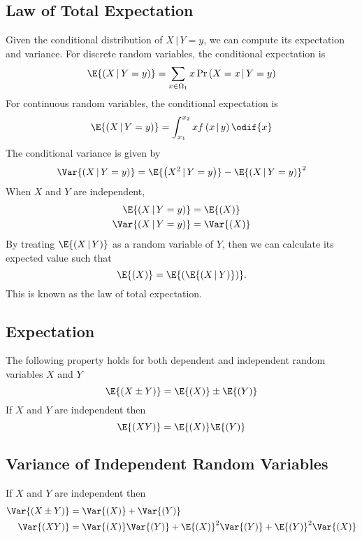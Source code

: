 \documentclass{article}
\begin{document}
\subsection{Law of Total Expectation}
Given the conditional distribution of \(X \,\vert\, Y = y\), we can compute its expectation and variance.
For discrete random variables, the conditional expectation is
\begin{equation*}
    \E{\left( X \,\vert\, Y = y \right)} = \sum_{x\in\Omega_1} x \Pr{\left( X = x \,\vert\, Y = y \right)}
\end{equation*}
For continuous random variables, the conditional expectation is
\begin{equation*}
    \E{\left( X \,\vert\, Y = y \right)} = \int_{x_1}^{x_2} x f\left( x \,\vert\, y \right) \odif{x}
\end{equation*}
The conditional variance is given by
\begin{equation*}
    \Var{\left( X \,\vert\, Y = y \right)} = \E{\left( X^2 \,\vert\, Y = y \right)} - \E{\left( X \,\vert\, Y = y \right)}^2
\end{equation*}
When \(X\) and \(Y\) are independent,
\begin{align*}
    \E{\left( X \,\vert\, Y = y \right)}   & = \E{\left( X \right)}   \\
    \Var{\left( X \,\vert\, Y = y \right)} & = \Var{\left( X \right)} \\
\end{align*}
By treating \(\E{\left( X \,\vert\, Y \right)}\) as a random variable of \(Y\), then
we can calculate its expected value such that
\begin{equation*}
    \E{\left( X \right)} = \E{\left( \E{\left( X \,\vert\, Y \right)} \right)}.
\end{equation*}
This is known as the law of total expectation.
\subsection{Expectation}
The following property holds for both dependent and independent random variables \(X\) and \(Y\)
\begin{equation*}
    \E{\left( X \pm Y \right)} = \E{\left( X \right)} \pm \E{\left( Y \right)}
\end{equation*}
If \(X\) and \(Y\) are independent then
\begin{equation*}
    \E{\left( XY \right)} = \E{\left( X \right)} \E{\left( Y \right)}
\end{equation*}
\subsection{Variance of Independent Random Variables}
If \(X\) and \(Y\) are independent then
\begin{align*}
    \Var{\left( X \pm Y \right)} & = \Var{\left( X \right)} + \Var{\left( Y \right)}                                                                                               \\
    \Var{\left( XY \right)}      & = \Var{\left( X \right)} \Var{\left( Y \right)} + \E{\left( X \right)}^2 \Var{\left( Y \right)} + \E{\left( Y \right)}^2 \Var{\left( X \right)}
\end{align*}
\end{document}
